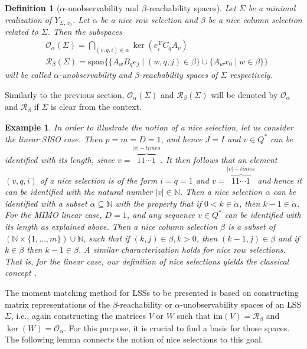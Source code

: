 \documentclass[journal]{IEEEtran}
\newcommand{\IM}{\mathrm{im}}
\newcommand{\SPAN}{\mathrm{span}}
\newtheorem{Definition}{Definition}
\newtheorem{Example}{Example}
\begin{document}
\begin{Definition}[$\alpha$-unobservability and $\beta$-reachability spaces]
Let  $\Sigma$ be a minimal realization of $Y_{\Sigma,x_0}$. Let $\alpha$ be a nice row selection and $\beta$ be a nice column selection related to $\Sigma$. Then the subspaces
\begin{equation*}
\begin{aligned}
& \mathscr{O}_\alpha(\Sigma)= \bigcap_{(v,q,i) \in \alpha} \ker (e_i^\mathrm{T}C_qA_v) \\
& \mathscr{R}_\beta(\Sigma) = \SPAN \{ \{ A_wB_qe_j \mid (w,q,j) \in \beta \} \cup \{ A_wx_0 \mid w \in \beta \} \}
\end{aligned}
\end{equation*}
will be called $\alpha$-unobservability and $\beta$-reachability spaces of $\Sigma$ respectively.
\end{Definition}
Similarly to the previous section, $\mathscr{O}_\alpha(\Sigma)$ and $\mathscr{R}_\beta(\Sigma)$ will be denoted by $\mathscr{O}_\alpha$ and $\mathscr{R}_\beta$ if $\Sigma$ is clear from the context. 

\begin{Example} \label{ex:nice_sel1}
	In order to illustrate the notion of a nice selection, let us consider the linear SISO case. Then $p=m=D=1$, and hence $J=I$ and $v \in  Q^{*}$ can be identified with its length, since $v=\overbrace{11\cdots 1}^{|v|-times}$. It then follows that an element $(v,q,i)$ of a nice selection is of the form $i=q=1$ and $v=\overbrace{11\cdots 1}^{|v|-times}$ and hence it can be identified with the natural number $|v| \in \mathbb{N}$. Then a nice selection $\alpha$ can be identified with a subset $\widetilde{\alpha} \subseteq \mathbb{N}$ with the property that if $0 < k \in \widetilde{\alpha}$, then $k-1 \in \widetilde{\alpha}$. For the MIMO linear case, $D=1$, and any sequence $v \in Q^{*}$ can be identified with its length as explained above. Then a nice column selection $\beta$ is a subset of $(\mathbb{N} \times \{1,\ldots,m\}) \cup \mathbb{N}$, such that if $(k,j) \in \beta, k > 0$, then $(k-1,j) \in \beta$ and if $k \in \beta$ then $k-1 \in \beta$. A similar characterization holds for nice row selections. That is, for the linear case, our definition of nice selections yields the classical concept \cite{Hazewinkel1}.
\end{Example}

The moment matching method for LSSs to be presented is based on constructing matrix representations of the $\beta$-reachability or $\alpha$-unobservability spaces of an LSS $\Sigma$, i.e., again constructing the matrices $V$ or $W$ such that $\IM (V)= \mathscr{R}_{\beta}$ and $\ker (W)= \mathscr{O}_{\alpha}$. For this purpose, it is crucial to find a basis for those spaces. The following lemma connects the notion of nice selections to this goal.
\end{document}
